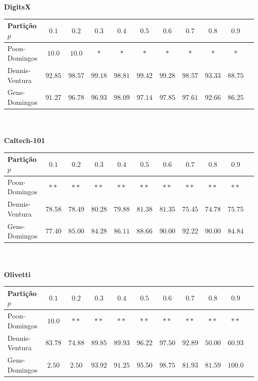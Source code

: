 \documentclass[12pt]{article}
\theoremstyle{plain}
\numberwithin{equation}{section}
\begin{document}
\begin{table}[h]
  \centering\textbf{DigitsX}\vspace{0.25cm}
  \begin{tabular}{l|cccccccccc}
    Partição $p$ & $0.1$ & $0.2$ & $0.3$ & $0.4$ & $0.5$ & $0.6$ & $0.7$ & $0.8$ & $0.9$\\
    \hline
    Poon-Domingos & $10.0$ & $10.0$ & $\ast$ & $\ast$ & $\ast$ & $\ast$ & $\ast$ & $\ast$ & $\ast$\\
    Dennis-Ventura & $92.85$ & $98.57$ & $99.18$ & $98.81$ & $99.42$ & $99.28$ & $98.57$ & $93.33$ & $88.75$\\
    Gens-Domingos & $91.27$ & $96.78$ & $96.93$ & $98.09$ & $97.14$ & $97.85$ & $97.61$ & $92.66$ & $86.25$\\
  \end{tabular}\\~\\
  \textbf{Caltech-101}\vspace{0.25cm}\\
  \begin{tabular}{l|cccccccccc}
    Partição $p$ & $0.1$ & $0.2$ & $0.3$ & $0.4$ & $0.5$ & $0.6$ & $0.7$ & $0.8$ & $0.9$\\
    \hline
    Poon-Domingos & $\ast\ast$ & $\ast\ast$ & $\ast\ast$ & $\ast\ast$ & $\ast\ast$ & $\ast\ast$ & $\ast\ast$ & $\ast\ast$ & $\ast\ast$\\
    Dennis-Ventura & $78.58$ & $78.49$ & $80.28$ & $79.88$ & $81.38$ & $81.35$ & $75.45$ & $74.78$ & $75.75$\\
    Gens-Domingos & $77.40$ & $85.00$ & $84.28$ & $86.11$ & $88.66$ & $90.00$ & $92.22$ & $90.00$ & $84.84$\\
  \end{tabular}\\~\\
  \textbf{Olivetti}\vspace{0.25cm}\\
  \begin{tabular}{l|cccccccccc}
    Partição $p$ & $0.1$ & $0.2$ & $0.3$ & $0.4$ & $0.5$ & $0.6$ & $0.7$ & $0.8$ & $0.9$\\
    \hline
    Poon-Domingos & $10.0$ & $\ast\ast$ & $\ast\ast$ & $\ast\ast$ & $\ast\ast$ & $\ast\ast$ & $\ast\ast$ & $\ast\ast$ & $\ast\ast$\\
    Dennis-Ventura & $83.78$ & $74.88$ & $89.85$ & $89.93$ & $96.22$ & $97.50$ & $92.89$ & $50.00$ & $60.93$\\
    Gens-Domingos & $2.50$ & $2.50$ & $93.92$ & $91.25$ & $95.50$ & $98.75$ & $81.93$ & $81.59$ & $100.0$\\

\end{tabular}
\end{table}
\end{document}
